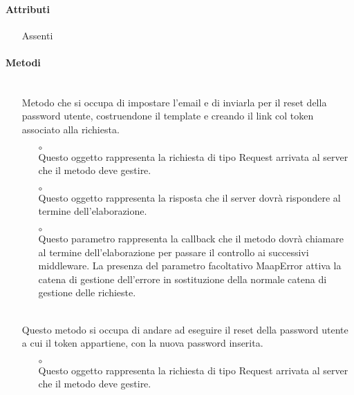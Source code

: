 \paragraph*{Attributi}
\begin{itemize}
\item[] Assenti
\end{itemize}

\paragraph*{Metodi}
\begin{itemize}
\item[]  \\ Metodo che si occupa di impostare l'email e di inviarla per il reset della password utente, costruendone il template e creando il link col token associato alla richiesta.
\begin{itemize}\addtolength{\itemsep}{-0.5\baselineskip}
\item[$\circ$]  \\ Questo oggetto rappresenta la richiesta di tipo Request arrivata al server che il metodo deve gestire.
\item[$\circ$]  \\ Questo oggetto rappresenta la risposta che il server dovrà rispondere al termine dell'elaborazione.
\item[$\circ$]  \\ Questo parametro rappresenta la callback che il metodo dovrà chiamare al termine dell'elaborazione per passare il controllo ai successivi middleware. La presenza del parametro facoltativo MaapError attiva la catena di gestione dell'errore in sostituzione della normale catena di gestione delle richieste.
\end{itemize}
\item[]  \\ Questo metodo si occupa di andare ad eseguire il reset della password utente a cui il token appartiene, con la nuova password inserita. 
\begin{itemize}\addtolength{\itemsep}{-0.5\baselineskip}
\item[$\circ$]  \\ Questo oggetto rappresenta la richiesta di tipo Request arrivata al server che il metodo deve gestire.

\end{itemize}
\end{itemize}
